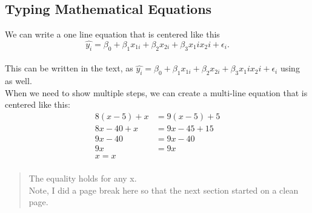 \documentclass{article}\usepackage[]{graphicx}\usepackage[]{xcolor}
\begin{document}
\begin{multicols}{2}
\subsection{Typing Mathematical Equations}
\noindent We can write a one line equation that is centered like this
\[\widehat{y_i} = \beta_0 + \beta_1 x_{1i}+ \beta_2 x_{2i} + \beta_3 x_1i x_2i + \epsilon_i.\]\\
\noindent This can be written in the text, as $\widehat{y_i} = \beta_0 + \beta_1 x_{1i}+ \beta_2 x_{2i} + \beta_3 x_1i x_2i + \epsilon_i$ using as well.\\
When we need to show multiple steps, we can create a multi-line equation that is centered like this:
\begin{align*}
8(x-5)+x&=9(x-5)+5\\
8x-40+x&=9x-45+15 \tag{Distributing}\\
9x-40&=9x-40 \tag{Combining like terms}\\
9x&=9x \tag{Adding 40 to both sides}\\
x=x \tag{Dividing both sides by 9}\\
\end{align*}
\begin{quote}
\noindent The equality holds for any x.\\
Note, I did a page break here so that the next section started on a clean page.
\newpage

\end{quote}
\end{multicols}
\end{document}
